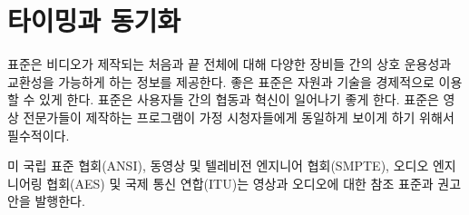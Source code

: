 \chapter{타이밍과 동기화}
표준은 비디오가 제작되는 처음과 끝 전체에 대해 다양한 장비들 간의 상호 운용성과 교환성을 가능하게 하는 정보를 제공한다. 좋은 표준은 자원과 기술을 경제적으로 이용할 수 있게 한다.
표준은 사용자들 간의 협동과 혁신이 일어나기 좋게 한다. 표준은 영상 전문가들이 제작하는 프로그램이 가정 시청자들에게 동일하게 보이게 하기 위해서 필수적이다.

미 국립 표준 협회(ANSI), 동영상 및 텔레비전 엔지니어 협회(SMPTE), 오디오 엔지니어링 협회(AES) 및 국제 통신 연합(ITU)는 영상과 오디오에 대한 참조 표준과 권고안을 발행한다.
